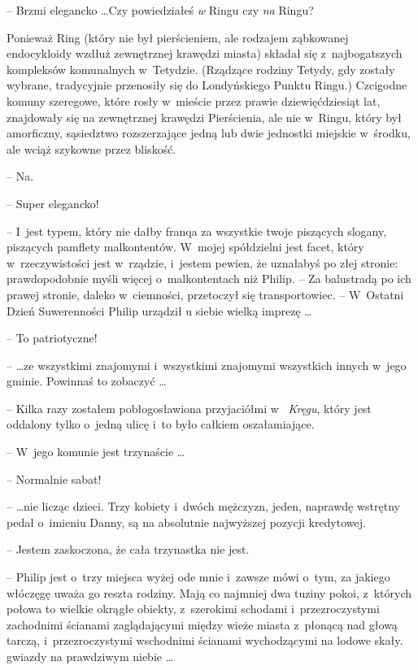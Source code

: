 \documentclass[oneside,polish,11pt,rmheadings]{mwbk}
\begin{document}
-- Brzmi elegancko  \ldots  Czy powiedziałeś \textit{w }Ringu czy \textit{na }Ringu? 

Ponieważ Ring (który nie był pierścieniem, ale rodzajem ząbkowanej endocykloidy wzdłuż zewnętrznej krawędzi miasta) składał się z~najbogatszych kompleksów komunalnych w~Tetydzie. (Rządzące rodziny Tetydy, gdy zostały wybrane, tradycyjnie przenosiły się do Londyńskiego Punktu Ringu.) Czcigodne komuny szeregowe, które rosły w~mieście przez prawie dziewięćdziesiąt lat, znajdowały się na zewnętrznej krawędzi Pierścienia, ale nie w~Ringu, który był amorficzny, sąsiedztwo rozszerzające jedną lub dwie jednostki miejskie w~środku, ale wciąż szykowne przez bliskość. 

-- Na. 

-- Super elegancko! 

-- I~jest typem, który nie dałby franqa za wszystkie twoje piszących slogany, piszących pamflety malkontentów. W~mojej spółdzielni jest facet, który w~rzeczywistości jest w~rządzie, i~jestem pewien, że uznałabyś po złej stronie: prawdopodobnie myśli więcej o~malkontentach niż Philip. -- Za balustradą po ich prawej stronie, daleko w~ciemności, przetoczył się transportowiec. -- W~Ostatni Dzień Suwerenności Philip urządził u siebie wielką imprezę \ldots  

-- To patriotyczne! 

--  \ldots ze wszystkimi znajomymi i~wszystkimi znajomymi wszystkich innych w~jego gminie. Powinnaś to zobaczyć \ldots  

-- Kilka razy zostałem pobłogosławiona przyjaciółmi w~\textit{ Kręgu}, który jest oddalony tylko o~jedną ulicę i~to było całkiem oszałamiające. 

-- W~jego komunie jest trzynaście \ldots  

-- Normalnie sabat! 

--  \ldots nie licząc dzieci. Trzy kobiety i~dwóch mężczyzn, jeden, naprawdę wstrętny pedał o~imieniu Danny, są na absolutnie najwyższej pozycji kredytowej. 

-- Jestem zaskoczona, że cała trzynastka nie jest. 

-- Philip jest o~trzy miejsca wyżej ode mnie i~zawsze mówi o~tym, za jakiego włóczęgę uważa go reszta rodziny. Mają co najmniej dwa tuziny pokoi, z~których połowa to wielkie okrągłe obiekty, z~szerokimi schodami i~przezroczystymi zachodnimi ścianami zaglądającymi między wieże miasta z~płonącą nad głową tarczą, i~przezroczystymi wschodnimi ścianami wychodzącymi na lodowe skały. gwiazdy na prawdziwym niebie \ldots  
\end{document}

